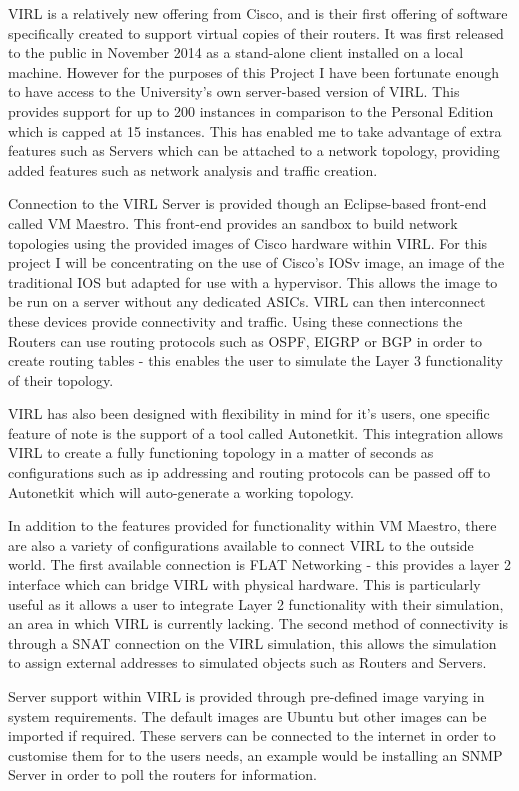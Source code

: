 \documentclass[11pt]{report}
\begin{document}
VIRL is a relatively new offering from Cisco, and is their first offering of software specifically created to support virtual copies of their routers. It was first released to the public in November 2014 as a stand-alone client installed on a local machine. However for the purposes of this Project I have been fortunate enough to have access to the University's own server-based version of VIRL. This provides support for up to 200 instances in comparison to the Personal Edition which is capped at 15 instances. This has enabled me to take advantage of extra features such as Servers which can be attached to a network topology, providing added features such as network analysis and traffic creation.

Connection to the VIRL Server is provided though an Eclipse-based front-end called VM Maestro. This front-end provides an sandbox to build network topologies using the provided images of Cisco hardware within VIRL. For this project I will be concentrating on the use of Cisco's IOSv image, an image of the traditional IOS but adapted for use with a hypervisor. This allows the image to be run on a server without any dedicated ASICs. VIRL can then interconnect these devices provide connectivity and traffic. Using these connections the Routers can use routing protocols such as OSPF, EIGRP or BGP in order to create routing tables - this enables the user to simulate the Layer 3 functionality of their topology.

VIRL has also been designed with flexibility in mind for it's users, one specific feature of note is the support of a tool called Autonetkit. This integration allows VIRL to create a fully functioning topology in a matter of seconds as configurations such as ip addressing and routing protocols can be passed off to Autonetkit which will auto-generate a working topology.

In addition to the features provided for functionality within VM Maestro, there are also a variety of configurations available to connect VIRL to the outside world. The first available connection is FLAT Networking - this provides a layer 2 interface which can bridge VIRL with physical hardware. This is particularly useful as it allows a user to integrate Layer 2 functionality with their simulation, an area in which VIRL is currently lacking. The second method of connectivity is through a SNAT connection on the VIRL simulation, this allows the simulation to assign external addresses to simulated objects such as Routers and Servers.

Server support within VIRL is provided through pre-defined image varying in system requirements. The default images are Ubuntu but other images can be imported if required. These servers can be connected to the internet in order to customise them for to the users needs, an example would be installing an SNMP Server in order to poll the routers for information.
\end{document}

